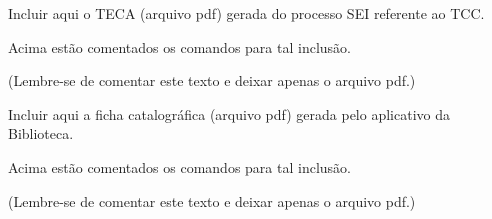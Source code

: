 \documentclass[
	12pt,				%
	openright,			%
	oneside,			%
	a4paper,			%
	sumario = tradicional,
	english,			%
	brazil,				%
	]{abntex2}
\begin{document}

\frenchspacing

\pretextual

\imprimircapa
%
{
\centerline{Incluir aqui o TECA (arquivo pdf) gerada do processo SEI referente ao TCC.\\}
%
\centerline{Acima estão comentados os comandos para tal inclusão.\\ }

\centerline{(Lembre-se de comentar este texto e deixar apenas o arquivo pdf.)}
}

\imprimirfolhaderosto

\centerline{Incluir aqui a ficha catalográfica (arquivo pdf) gerada pelo aplicativo da Biblioteca.\\}
%
\centerline{Acima estão comentados os comandos para tal inclusão.\\ }

\centerline{(Lembre-se de comentar este texto e deixar apenas o arquivo pdf.)}
\newpage




%
\end{document}
